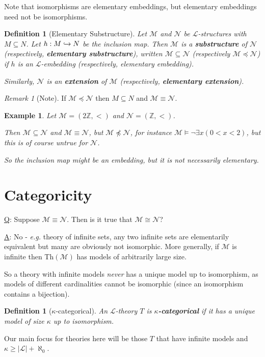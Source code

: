 \documentclass[]{article}
\theoremstyle{custhm}
\theoremstyle{cusdef}
\newtheorem{defin}[theorem]{Definition}
\theoremstyle{custhm}
\theoremstyle{custhm}
\theoremstyle{custhm}
\theoremstyle{ex}
\newtheorem{ex}[theorem]{Example}
\theoremstyle{custhm}
\theoremstyle{cusdef}
\theoremstyle{remark}
\newtheorem*{remark*}{Remark}
\theoremstyle{remark}
\newcommand{\Z}{\mathbb{Z}}
\newcommand{\undf}[1]{\textit{\textbf{#1}}}
\renewcommand{\L}{\mathcal{L}}
\renewcommand{\it}[1]{\textit{#1}}
\newcommand{\M}{\mathcal{M}}
\newcommand{\N}{\mathcal{N}}
\renewcommand{\subset}{\subseteq}
\begin{document}
Note that isomorphisms are elementary embeddings, but elementary embeddings need not be isomorphisms.

\begin{defin}[Elementary Substructure]
Let $\M$ and $\N$ be $\L$-structures with $M\subset N$. Let $h:M \xhookrightarrow{} N$ be the inclusion map. Then $\M$ is a \undf{substructure} of $\N$ (respectively, \undf{elementary substructure}), written $\M\subset \N$ (respectively $\M\preceq\N$) if $h$ is an $\L$-embedding (respectively, elementary embedding).

Similarly, $\N$ is an \undf{extension} of $\M$ (respectively, \undf{elementary extension}).
\end{defin}	

\begin{remark*}[Note]
If $\M\preceq\N$ then $M\subset N$ and $\M\equiv \N$.
\end{remark*}
\begin{ex}
Let $\M = (2\Z, <)$ and $\N = (\Z, <)$.

Then $\M \subset \N$ and $\M \equiv \N$, but $\M\not\preceq\N$, for instance $\M\models \neg\exists x(0 < x < 2)$, but this is of course untrue for $\N$.

So the inclusion map might be an embedding, but it is not necessarily elementary.
\end{ex}


\section{Categoricity}

\underline{Q}: Suppose $\M\equiv\N$. Then is it true that $\M \cong \N$?

\underline{A}: No - \it{e.g.} theory of infinite sets, any two infinite sets are elementarily equivalent but many are obviously not isomorphic. More generally, if $\M$ is infinite then Th$(\M)$ has models of arbitrarily large size.

So a theory with infinite models \it{never} has a unique model up to isomorphism, as models of different cardinalities cannot be isomorphic (since an isomorphism contains a bijection).

\begin{defin}[$\kappa$-categorical]
An $\L$-theory $T$ is \undf{$\kappa$-categorical} if it has a unique model of size $\kappa$ up to isomorphism.
\end{defin}
Our main focus for theories here will be those $T$ that have infinite models and $\kappa \ge |\L| + \aleph_0$.
\end{document}
